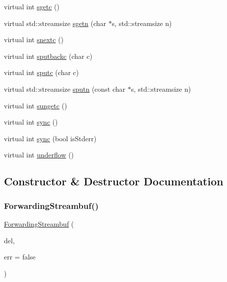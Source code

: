 \begin{DoxyCompactItemize}
\item 
virtual int \mbox{\hyperlink{classsgl_1_1ForwardingStreambuf_abf3bd66eb386006b5f74a7bcdf1c3b4b}{sgetc}} ()
\item 
virtual std\+::streamsize \mbox{\hyperlink{classsgl_1_1ForwardingStreambuf_a117eab93aac941f3cee780c5c2ecf58b}{sgetn}} (char $\ast$s, std\+::streamsize n)
\item 
virtual int \mbox{\hyperlink{classsgl_1_1ForwardingStreambuf_a17a9adc0f91f53a184f79fa84db9bca7}{snextc}} ()
\item 
virtual int \mbox{\hyperlink{classsgl_1_1ForwardingStreambuf_a2d0d4eb097eb268d3c7181204d156689}{sputbackc}} (char c)
\item 
virtual int \mbox{\hyperlink{classsgl_1_1ForwardingStreambuf_ac2e29fbc1c3df5e6a85172ddbcbacae9}{sputc}} (char c)
\item 
virtual std\+::streamsize \mbox{\hyperlink{classsgl_1_1ForwardingStreambuf_a68372b953d8e4c4754586deb450fe84d}{sputn}} (const char $\ast$s, std\+::streamsize n)
\item 
virtual int \mbox{\hyperlink{classsgl_1_1ForwardingStreambuf_a3c92fd32c60f1c7fe6c6b8c80a970465}{sungetc}} ()
\item 
virtual int \mbox{\hyperlink{classsgl_1_1ForwardingStreambuf_a810a727ce5554d3178e17b6bc55025dd}{sync}} ()
\item 
virtual int \mbox{\hyperlink{classsgl_1_1ForwardingStreambuf_ad5f4344df2a20a0000adb05d4e656855}{sync}} (bool is\+Stderr)
\item 
virtual int \mbox{\hyperlink{classsgl_1_1ForwardingStreambuf_aeb6918bd44153b257e097e2d2ef370ef}{underflow}} ()
\end{DoxyCompactItemize}


\subsection{Constructor \& Destructor Documentation}
\mbox{\label{classsgl_1_1ForwardingStreambuf_a8117dcf1a6c10e98afb196a6f1346dd9}} 
\subsubsection{\texorpdfstring{Forwarding\+Streambuf()}{ForwardingStreambuf()}}
{\footnotesize\ttfamily \mbox{\hyperlink{classsgl_1_1ForwardingStreambuf}{Forwarding\+Streambuf}} (\begin{DoxyParamCaption}\item[{\mbox{\hyperlink{classsgl_1_1ConsoleStreambuf}{Console\+Streambuf}} \&}]{del,  }\item[{bool}]{err = {\ttfamily false} }\end{DoxyParamCaption})\hspace{0.3cm}{\ttfamily [inline]}}



